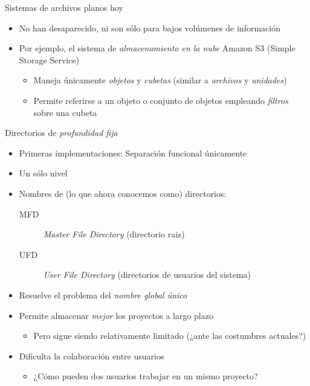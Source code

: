 \documentclass[presentation]{beamer}
\begin{document}
\begin{frame}[label={sec:org09afd53}]{Sistemas de archivos planos hoy}
\begin{itemize}
\item No han desaparecido, ni son sólo para bajos volúmenes de información
\item Por ejemplo, el sistema de \emph{almacenamiento en la nube} Amazon S3
(Simple Storage Service)
\begin{itemize}
\item Maneja únicamente \emph{objetos} y \emph{cubetas} (similar a \emph{archivos} y
\emph{unidades})
\item Permite referirse a un objeto o conjunto de objetos empleando
\emph{filtros} sobre una cubeta
\end{itemize}
\end{itemize}
\end{frame}

\begin{frame}[label={sec:orged40ba2}]{Directorios de \emph{profundidad fija}}
\begin{itemize}
\item Primeras implementaciones: Separación funcional únicamente
\item Un sólo nivel
\item Nombres de (lo que ahora conocemos como) directorios:
\begin{description}
\item[{MFD}] \emph{Master File Directory}  (directorio raiz)
\item[{UFD}] \emph{User File Directory} (directorios de usuarios del sistema)
\end{description}
\item Resuelve el problema del \emph{nombre global único}
\item Permite almacenar \emph{mejor} los proyectos a largo plazo
\begin{itemize}
\item Pero sigue siendo relativamente limitado (¿ante las costumbres actuales?)
\end{itemize}
\item Dificulta la colaboración entre usuarios
\begin{itemize}
\item ¿Cómo pueden dos usuarios trabajar en un mismo proyecto?
\end{itemize}
\end{itemize}
\end{frame}
\end{document}
